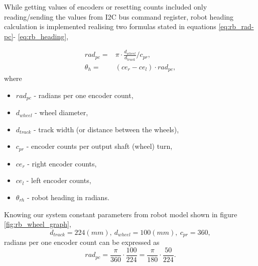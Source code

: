 While getting values of encoders or resetting counts included only reading/sending the values from  I2C bus command register, robot heading calculation is implemented realising two formulas stated in equations \ref{eq:rb_rad-pc}- \ref{eq:rb_heading},

\begin{eqnarray}
rad_{pc}  = & \pi \cdot \frac{ d_{wheel} }{ d_{track} } / c_{pr}	,
\label{eq:rb_rad-pc}
\\
\theta_{h} = & (ce_{r} - ce_{l} ) \cdot rad_{pc} ,
\label{eq:rb_heading}
\end{eqnarray}
where 
\begin{itemize}
	\item $rad_{pc}$ - radians per one encoder count,
	\item $d_{wheel}$ - wheel diameter,
	\item $d_{track}$ - track width (or distance between the wheels), %
	\item $c_{pr}$ - encoder counts per output shaft (wheel) turn,
	\item $ce_{r}$ - right encoder counts,
	\item $ce_{l}$ - left encoder counts,
	\item $\theta_{rh}$ - robot heading in radians.
\end{itemize}

Knowing our system constant parameters from robot model shown in figure \ref{fig:rb_wheel_graph},
$$
d_{track} = 224 (mm), \ d_{wheel}=100 (mm), \ c_{pr}=360,
$$
radians per one encoder count can be expressed as
$$
rad_{pc}  = \frac{\pi}{360}\cdot \frac{ 100 }{ 224 } = \frac{\pi}{180}\cdot \frac{ 50 }{ 224 }.
$$


